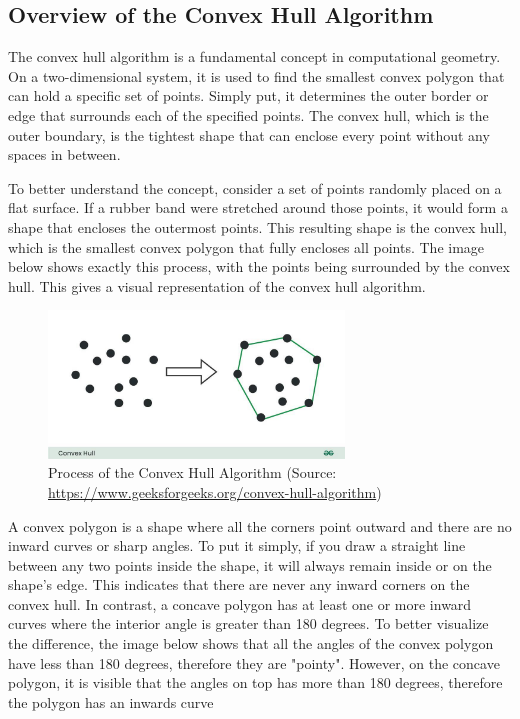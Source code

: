    \subsection{Overview of the Convex Hull Algorithm}
    The convex hull algorithm is a fundamental concept in computational geometry. On a two-dimensional system, it is used to find the smallest convex polygon that can hold a specific set of points. Simply put, it determines the outer border or edge that surrounds each of the specified points. The convex hull, which is the outer boundary, is the tightest shape that can enclose every point without any spaces in between. \newline
    
    To better understand the concept, consider a set of points randomly placed on a flat surface. If a rubber band were stretched around those points, it would form a shape that encloses the outermost points. This resulting shape is the convex hull, which is the smallest convex polygon that fully encloses all points. The image below shows exactly this process, with the points being surrounded by the convex hull. This gives a visual representation of the convex hull algorithm.
    \begin{figure} [H]
        \centering
        \includegraphics [width=0.7\textwidth] {images/andreas/areaBorders/convexHull.jpg}
        \caption{Process of the Convex Hull Algorithm (Source: \url{https://www.geeksforgeeks.org/convex-hull-algorithm})}
    \end{figure} 
    \blankLine 
    A convex polygon is a shape where all the corners point outward and there are no inward curves or sharp angles. To put it simply, if you draw a straight line between any two points inside the shape, it will always remain inside or on the shape's edge. This indicates that there are never any inward corners on the convex hull. In contrast, a concave polygon has at least one or more inward curves where the interior angle is greater than 180 degrees. \newline
    To better visualize the difference, the image below shows that all the angles of the convex polygon have less than 180 degrees, therefore they are "pointy". However, on the concave polygon, it is visible that the angles on top has more than 180 degrees, therefore the polygon has an inwards curve \autocite{Andi:convexPolygon}

